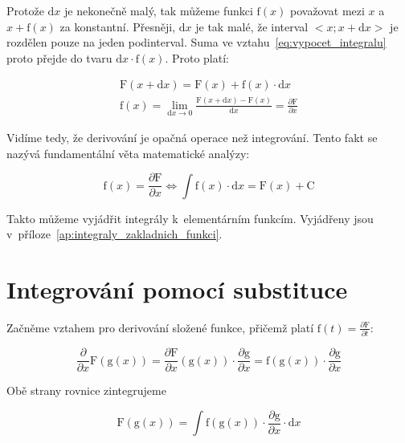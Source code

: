 Protože \(\mathrm{d}x\) je nekonečně malý, tak můžeme funkci \(\mathrm{f}(x)\) považovat mezi \(x\) a~\(x + \mathrm{f}(x)\) za konstantní. Přesněji, \(\mathrm{d}x\) je tak malé, že interval \(<x; x + \mathrm{d}x>\) je rozdělen pouze na jeden podinterval. Suma ve vztahu~\eqref{eq:vypocet_integralu} proto přejde do tvaru \(\mathrm{d}x \cdot \mathrm{f}(x)\).
Proto platí:

\begin{equation}
\begin{split}
\mathrm{F}(x + \mathrm{d}x) = \mathrm{F}(x) + \mathrm{f}(x) \cdot \mathrm{d}x \\
\mathrm{f}(x) = \lim_{\mathrm{d}x \to 0} \frac{\mathrm{F}(x + \mathrm{d}x) - \mathrm{F}(x)}{\mathrm{d}x} = \frac{\partial \mathrm{F}}{\partial x} 
\end{split}
\end{equation}

Vidíme tedy, že derivování je opačná operace než integrování. Tento fakt se nazývá fundamentální věta matematické analýzy:

\begin{fact}
\begin{equation}
\mathrm{f}(x) = \frac{\partial \mathrm{F}}{\partial x} \Leftrightarrow \int \mathrm{f}(x) \cdot \mathrm{d}x = \mathrm{F}(x) + \mathrm{C}
\end{equation}
\end{fact}

Takto můžeme vyjádřit integrály k~elementárním funkcím. Vyjádřeny jsou v~příloze~\ref{ap:integraly_zakladnich_funkci}.

\section{Integrování pomocí substituce}

Začněme vztahem pro derivování složené funkce, přičemž platí \(\mathrm{f}(t) = \frac{\partial \mathrm{F}}{\partial t}\):

\begin{equation}
\frac{\partial}{\partial x} \mathrm{F}(\mathrm{g}(x)) = \frac{\partial \mathrm{F}}{\partial x} (\mathrm{g}(x)) \cdot \frac{\partial \mathrm{g}}{\partial x} = \mathrm{f}(\mathrm{g}(x)) \cdot \frac{\partial \mathrm{g}}{\partial x}
\end{equation}

Obě strany rovnice zintegrujeme

\begin{equation}
\mathrm{F}(\mathrm{g}(x)) = \int \mathrm{f}(\mathrm{g}(x)) \cdot \frac{\partial \mathrm{g}}{\partial x} \cdot \mathrm{d}x
\end{equation}

